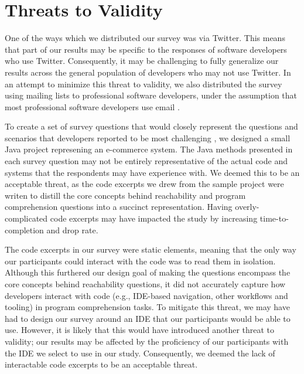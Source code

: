 \section{Threats to Validity}
\label{sec:ThreatsToValidity}


\noindent One of the ways which we distributed our survey was via Twitter.  
This means that part of our results may be specific to the responses of
software developers who use Twitter.
Consequently, it may be challenging to fully generalize our results across
the general population of developers who may not use Twitter.
In an attempt to minimize this threat to validity, we also distributed the 
survey using mailing lists to professional software developers, under the
assumption that most professional software developers use email
\cite{gousios-2016-work-practices}.


\par To create a set of survey questions that would closely represent the
questions and scenarios that developers reported to be most challenging
\cite{latoza-2010-hard-questions, latoza-2010-reach}, we designed a small Java
project represening an e-commerce system.
The Java methods presented in each survey question may not be entirely
representative of the actual code and systems that the respondents may have
experience with.
We deemed this to be an acceptable threat, as the code excerpts we drew from
the sample project were writen to distill the core concepts behind
reachability and program comprehension questions into a succinct representation.
Having overly-complicated code excerpts may have impacted the study by
increasing time-to-completion and drop rate.

\par The code excerpts in our survey were static elements, meaning that the
only way our participants could interact with the code was to read them
in isolation.
Although this furthered our design goal of making the questions encompass
the core concepts behind reachability questions, it did not accurately
capture how developers interact with code (e.g., IDE-based navigation, 
other workflows and tooling) in program comprehension tasks.
To mitigate this threat, we may have had to design our survey around an IDE 
that our participants would be able to use.
However, it is likely that this would have introduced another threat to
validity; our results may be affected by the proficiency of our participants
with the IDE we select to use in our study.
Consequently, we deemed the lack of interactable code excerpts to be an 
acceptable threat.

